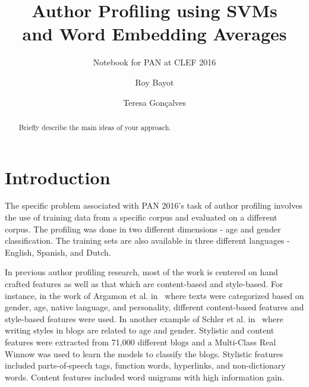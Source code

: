 \documentclass{llncs}
\begin{document}
\title{Author Profiling using SVMs\\and Word Embedding Averages}
\subtitle{Notebook for PAN at CLEF 2016}

\author{Roy Bayot \and Teresa Gonçalves}

\maketitle

\begin{abstract}
Briefly describe the main ideas of your approach.
\end{abstract}


\section{Introduction}
The specific problem associated with PAN 2016's task of author profiling involves the use of training data from a specific corpus and evaluated on a different corpus. The profiling was done in two different dimensions - age and gender classification. The training sets are also available in three different languages - English, Spanish, and Dutch. 

In previous author profiling research, most of the work is centered on hand crafted features as well as that which are content-based and style-based. For instance, in the work of Argamon et al. in~\cite{argamon2009automatically} where texts were categorized based on gender, age, native language, and personality, different content-based features and style-based features were used. In another example of Schler et al. in~\cite{schler2006effects} where writing styles in blogs are related to age and gender. Stylistic and content features were extracted from 71,000 different blogs and a Multi-Class Real Winnow was used to learn the models to classify the blogs. Stylistic features included parts-of-speech tags, function words, hyperlinks, and non-dictionary words. Content features included word unigrams with high information gain. %
\end{document}
